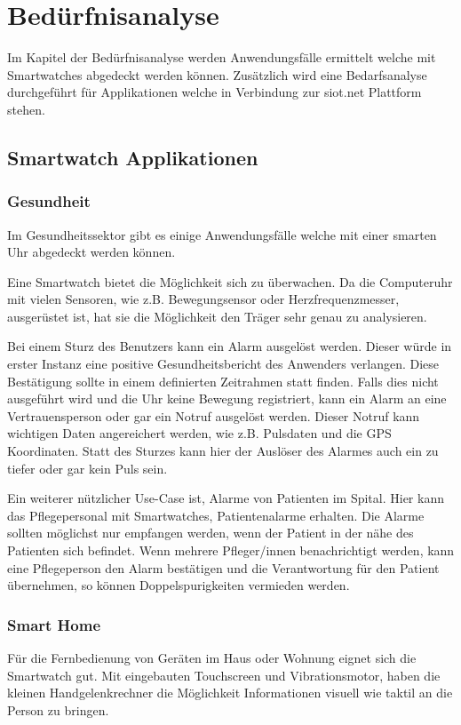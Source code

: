 \chapter{Bedürfnisanalyse}

Im Kapitel der Bedürfnisanalyse werden Anwendungsfälle ermittelt welche mit Smartwatches abgedeckt werden können. Zusätzlich wird eine Bedarfsanalyse durchgeführt für Applikationen welche in Verbindung zur siot.net Plattform stehen.
\section{Smartwatch Applikationen}
\subsection{Gesundheit}
Im Gesundheitssektor gibt es einige Anwendungsfälle welche mit einer smarten Uhr abgedeckt werden können.

Eine Smartwatch bietet die Möglichkeit sich zu überwachen. Da die Computeruhr mit vielen Sensoren, wie z.B. Bewegungsensor oder Herzfrequenzmesser, ausgerüstet ist, hat sie die Möglichkeit den Träger sehr genau zu analysieren.

Bei einem Sturz des Benutzers kann ein Alarm ausgelöst werden. Dieser würde in erster Instanz eine positive Gesundheitsbericht des Anwenders verlangen. Diese Bestätigung sollte in einem definierten Zeitrahmen statt finden. Falls dies nicht ausgeführt wird und die Uhr keine Bewegung registriert, kann ein Alarm an eine Vertrauensperson oder gar ein Notruf ausgelöst werden. Dieser Notruf kann wichtigen Daten angereichert werden, wie z.B. Pulsdaten und die GPS Koordinaten. Statt des Sturzes kann hier der Auslöser des Alarmes auch ein zu tiefer oder gar kein Puls sein.

Ein weiterer nützlicher Use-Case ist, Alarme von Patienten im Spital. Hier kann das Pflegepersonal mit Smartwatches, Patientenalarme erhalten. Die Alarme sollten möglichst nur empfangen werden, wenn der Patient in der nähe des Patienten sich befindet. Wenn mehrere Pfleger/innen benachrichtigt werden, kann eine Pflegeperson den Alarm bestätigen und die Verantwortung für den Patient übernehmen, so können Doppelspurigkeiten vermieden werden.

\subsection{Smart Home}
Für die Fernbedienung von Geräten im Haus oder Wohnung eignet sich die Smartwatch gut. Mit eingebauten Touchscreen und Vibrationsmotor, haben die kleinen Handgelenkrechner die Möglichkeit Informationen visuell wie taktil an die Person zu bringen.

